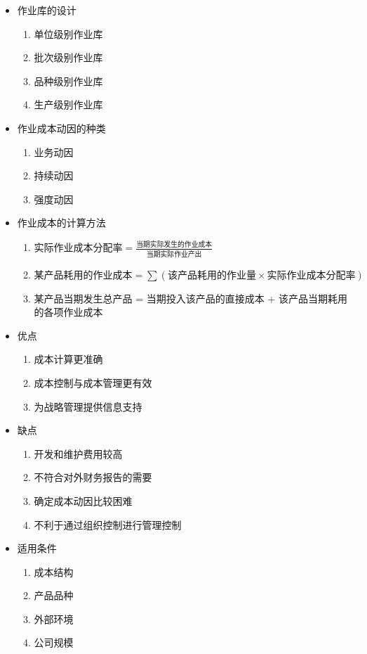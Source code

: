 \documentclass[11pt]{article}
\begin{document}
\begin{itemize}
\item 作业库的设计
\begin{enumerate}
\item 单位级别作业库
\item 批次级别作业库
\item 品种级别作业库
\item 生产级别作业库
\end{enumerate}
\item 作业成本动因的种类
\begin{enumerate}
\item 业务动因
\item 持续动因
\item 强度动因
\end{enumerate}
\item 作业成本的计算方法
\begin{enumerate}
\item \(实际作业成本分配率 = \frac{当期实际发生的作业成本}{当期实际作业产出}\)
\item \(某产品耗用的作业成本 = \sum(该产品耗用的作业量 \times 实际作业成本分配率)\)
\item 某产品当期发生总产品 = 当期投入该产品的直接成本 + 该产品当期耗用的各项作业成本
\end{enumerate}
\item 优点
\begin{enumerate}
\item 成本计算更准确
\item 成本控制与成本管理更有效
\item 为战略管理提供信息支持
\end{enumerate}
\item 缺点
\begin{enumerate}
\item 开发和维护费用较高
\item 不符合对外财务报告的需要
\item 确定成本动因比较困难
\item 不利于通过组织控制进行管理控制
\end{enumerate}
\item 适用条件
\begin{enumerate}
\item 成本结构
\item 产品品种
\item 外部环境
\item 公司规模
\end{enumerate}
\end{itemize}
\end{document}
